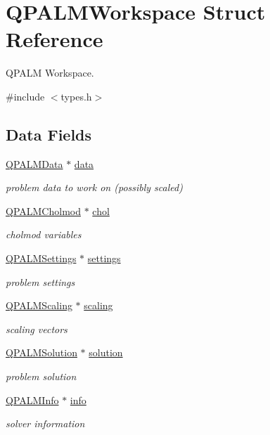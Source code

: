 \hypertarget{structQPALMWorkspace}{}\section{Q\+P\+A\+L\+M\+Workspace Struct Reference}
\label{structQPALMWorkspace}


Q\+P\+A\+LM Workspace.  




{\ttfamily \#include $<$types.\+h$>$}

\subsection*{Data Fields}
\begin{DoxyCompactItemize}
\item 
\mbox{\hyperlink{structQPALMData}{Q\+P\+A\+L\+M\+Data}} $\ast$ \mbox{\hyperlink{structQPALMWorkspace_aef5a70ffeeade2377480c7cae36a8964}{data}}
\begin{DoxyCompactList}\small\item\em problem data to work on (possibly scaled) \end{DoxyCompactList}\item 
\mbox{\hyperlink{structQPALMCholmod}{Q\+P\+A\+L\+M\+Cholmod}} $\ast$ \mbox{\hyperlink{structQPALMWorkspace_ad848957a0173251709fb56804f6ef10e}{chol}}
\begin{DoxyCompactList}\small\item\em cholmod variables \end{DoxyCompactList}\item 
\mbox{\hyperlink{structQPALMSettings}{Q\+P\+A\+L\+M\+Settings}} $\ast$ \mbox{\hyperlink{structQPALMWorkspace_a9e29077d16b88e77e8aae6f06f69ec0c}{settings}}
\begin{DoxyCompactList}\small\item\em problem settings \end{DoxyCompactList}\item 
\mbox{\hyperlink{structQPALMScaling}{Q\+P\+A\+L\+M\+Scaling}} $\ast$ \mbox{\hyperlink{structQPALMWorkspace_a20daf0c6d38c77121e113af63ed726b6}{scaling}}
\begin{DoxyCompactList}\small\item\em scaling vectors \end{DoxyCompactList}\item 
\mbox{\hyperlink{structQPALMSolution}{Q\+P\+A\+L\+M\+Solution}} $\ast$ \mbox{\hyperlink{structQPALMWorkspace_a44a489b6424974f302d679893efae327}{solution}}
\begin{DoxyCompactList}\small\item\em problem solution \end{DoxyCompactList}\item 
\mbox{\hyperlink{structQPALMInfo}{Q\+P\+A\+L\+M\+Info}} $\ast$ \mbox{\hyperlink{structQPALMWorkspace_a37b5c22c01352658c55dadcde7481222}{info}}
\begin{DoxyCompactList}\small\item\em solver information \end{DoxyCompactList}\end{DoxyCompactItemize}
